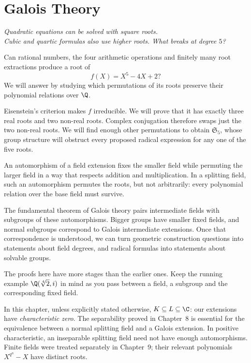 \chapter{Galois Theory}

\begin{center}\itshape
Quadratic equations can be solved with square roots.\\
Cubic and quartic formulas also use higher roots. What breaks at degree $5$?
\end{center}

Can rational numbers, the four arithmetic operations and finitely many root
extractions produce a root of
\[
f(X)=X^5-4X+2?
\]
We will answer by studying which permutations of its roots preserve their
polynomial relations over $\Q$.

Eisenstein's criterion makes $f$ irreducible. We will prove that it has exactly
three real roots and two non-real roots. Complex conjugation therefore swaps
just the two non-real roots. We will find enough other permutations to obtain
$\mathfrak S_5$, whose group structure will obstruct every proposed radical
expression for any one of the five roots.

An automorphism of a field extension fixes the smaller field while permuting the larger field in a way that respects addition and multiplication. In a splitting field, such an automorphism permutes the roots, but not arbitrarily: every polynomial relation over the base field must survive.

The fundamental theorem of Galois theory pairs intermediate fields with subgroups of these automorphisms. Bigger groups have smaller fixed fields, and normal subgroups correspond to Galois intermediate extensions. Once that correspondence is understood, we can turn geometric construction questions into statements about field degrees, and radical formulas into statements about solvable groups.

The proofs here have more stages than the earlier ones. Keep the running example $\Q(\sqrt[4]2,i)$ in mind as you pass between a field, a subgroup and the corresponding fixed field.

In this chapter, unless explicitly stated otherwise, $K\subseteq L\subseteq\C$:
our extensions have \emph{characteristic zero}. The separability
proved in Chapter~8 is essential for the equivalence between a normal
splitting field and a Galois extension. In positive characteristic,
an inseparable splitting field need not have enough automorphisms.
Finite fields were treated separately in Chapter~9; their relevant
polynomials $X^{q^n}-X$ have distinct roots.

